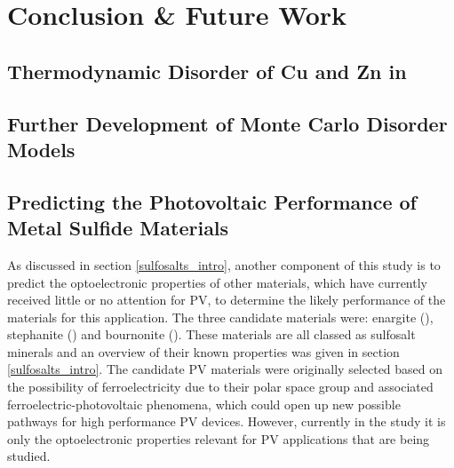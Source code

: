 
\chapter{Conclusion \& Future Work}
\label{ch:conclusions}

\section{Thermodynamic Disorder of Cu and Zn in {\CZTS}}



\section{Further Development of Monte Carlo Disorder Models}



\section{Predicting the Photovoltaic Performance of Metal Sulfide Materials}\label{sulfosalts_proj}
As discussed in section \ref{sulfosalts_intro}, another component of this study is to predict the optoelectronic properties of other materials, which have currently received little or no attention for PV, to determine the likely performance of the materials for this application. The three candidate materials were: enargite ({\enargite}), stephanite ({\stephanite}) and bournonite ({\bournonite}). These materials are all classed as sulfosalt minerals and an overview of their known properties was given in section \ref{sulfosalts_intro}. The candidate PV materials were originally selected based on the possibility of ferroelectricity due to their polar space group and associated ferroelectric-photovoltaic phenomena, which could open up new possible pathways for high performance PV devices. However, currently in the study it is only the optoelectronic properties relevant for PV applications that are being studied.

